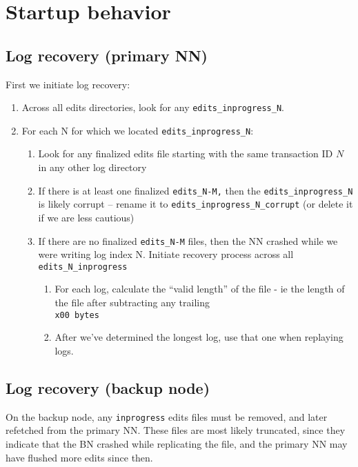 \documentclass{article}
\begin{document}
\section{Startup behavior}

\subsection{Log recovery (primary NN)}\label{logrecovery}
First we initiate log recovery:
\begin{enumerate}
  \item Across all edits directories, look for any {\tt edits\_inprogress\_N}.
  \item For each N for which we located {\tt edits\_inprogress\_N}:
  \begin{enumerate}
    \item Look for any finalized edits file starting with the same transaction ID $N$ in any other log directory
    \item If there is at least one finalized {\tt edits\_N-M,} then the {\tt edits\_inprogress\_N} is likely corrupt – rename it to {\tt edits\_inprogress\_N\_corrupt} (or delete it if we are less cautious)
    \item If there are no finalized {\tt edits\_N-M} files, then the NN crashed while we were writing log index N. Initiate recovery process across all {\tt edits\_N\_inprogress}
    \begin{enumerate}
      \item  For each log, calculate the ``valid length'' of the file - ie the length of the file after subtracting any trailing {\tt \\x00 bytes}
      \item  After we've determined the longest log, use that one when replaying logs.
    \end{enumerate}
  \end{enumerate}
\end{enumerate}

\subsection{Log recovery (backup node)}\label{bnrecovery}

On the backup node, any {\tt inprogress} edits files must be removed, and later refetched from the primary NN.
These files are most likely truncated, since they indicate that the BN crashed while replicating the file, and the
primary NN may have flushed more edits since then.
\end{document}
